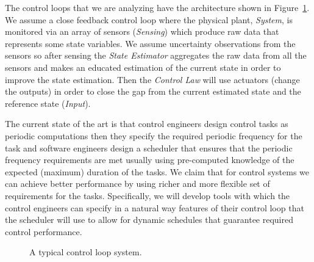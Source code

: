 \documentclass[11pt]{article}
\begin{document}
The control loops that we are analyzing have the architecture shown in Figure~\ref{fig:control loop}. 
We assume a close feedback control loop where the physical plant, \textit{System}, is monitored via an array of sensors (\textit{Sensing}) which produce raw data that represents some state variables. 
We assume uncertainty observations from the sensors so after sensing the \textit{State Estimator} aggregates the raw data from all the sensors and makes an educated estimation of the current state in order to improve the state estimation. Then the \textit{Control Law} will use actuators (change the outputs)  in order to close the gap from the current estimated state and the reference state (\textit{Input}).

The current state of the art is that control engineers design control tasks as periodic computations then they specify the required periodic frequency for the task and software engineers design a scheduler that ensures that the periodic frequency requirements are met usually using pre-computed knowledge of the expected (maximum) duration of the tasks.
We claim that for control systems we can achieve better performance by using richer and more flexible set of requirements for the tasks. Specifically, we will develop tools with which the control engineers can specify in a natural way features of their control loop that the scheduler will use to allow for dynamic schedules that guarantee required control performance. 

\begin{figure}[]
    \centering
    
    
    \caption{A typical control loop system.
    \label{fig:control loop}}
\end{figure}
\end{document}
